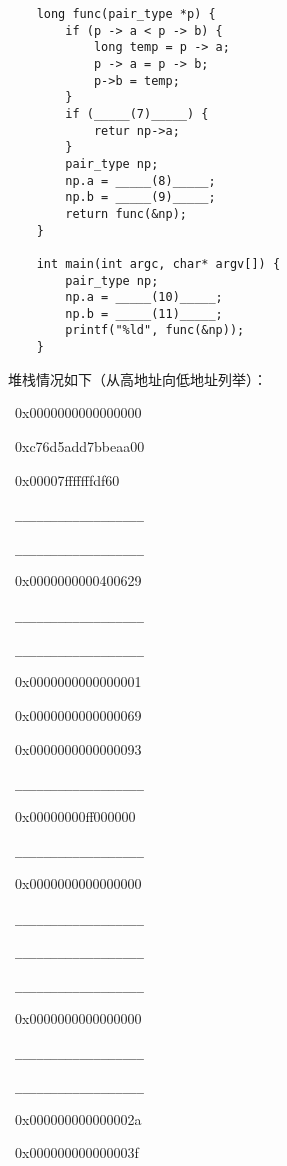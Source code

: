 \begin{problems}
\begin{verbatim}
    long func(pair_type *p) {
        if (p -> a < p -> b) {
            long temp = p -> a;
            p -> a = p -> b;
            p->b = temp;
        }
        if (_____(7)_____) {
            retur np->a;
        }
        pair_type np;
        np.a = _____(8)_____;
        np.b = _____(9)_____;
        return func(&np);
    } 

    int main(int argc, char* argv[]) {
        pair_type np;
        np.a = _____(10)_____;
        np.b = _____(11)_____;
        printf("%ld", func(&np));
    }
        \end{verbatim}
        堆栈情况如下（从高地址向低地址列举）：
        {\tt \begin{compactenum}
            \item\ 0x0000000000000000
            \item\ 0xc76d5add7bbeaa00 
            \item\ 0x00007fffffffdf60 
            \item\ \verb|__________________|
            \item\ \verb|__________________|
            \item\ 0x0000000000400629 
            \item\ \verb|__________________|
            \item\ \verb|__________________|
            \item\ 0x0000000000000001 
            \item\ 0x0000000000000069 
            \item\ 0x0000000000000093 
            \item\ \verb|__________________|
            \item\ 0x00000000ff000000 
            \item\ \verb|__________________|
            \item\ 0x0000000000000000 
            \item\ \verb|__________________|
            \item\ \verb|__________________|
            \item\ \verb|__________________|
            \item\ 0x0000000000000000 
            \item\ \verb|__________________|
            \item\ \verb|__________________|
            \item\ 0x000000000000002a 
            \item\ 0x000000000000003f 

\end{compactenum}}
\end{problems}
